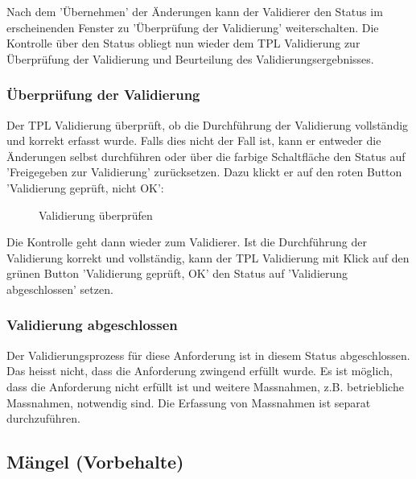 Nach dem 'Übernehmen' der Änderungen kann der Validierer den Status im erscheinenden Fenster zu 'Überprüfung der Validierung' weiterschalten. Die Kontrolle über den Status obliegt nun wieder dem TPL Validierung zur Überprüfung der Validierung und Beurteilung des Validierungsergebnisses. 

\subsubsection{Überprüfung der Validierung}
\label{bkm:Ref2018071812}

Der TPL Validierung überprüft, ob die Durchführung der Validierung vollständig und korrekt erfasst wurde. Falls dies nicht der Fall ist, kann er entweder die Änderungen selbst durchführen oder über die farbige Schaltfläche den Status auf 'Freigegeben zur Validierung' zurücksetzen. Dazu klickt er auf den roten Button 'Validierung geprüft, nicht OK': 

\begin{figure}[H]
\caption{Validierung überprüfen}
\end{figure}

Die Kontrolle geht dann wieder zum Validierer. Ist die Durchführung der Validierung korrekt und vollständig, kann der TPL Validierung mit Klick auf den grünen Button 'Validierung geprüft, OK' den Status auf 'Validierung abgeschlossen' setzen. 

\subsubsection{Validierung abgeschlossen}

Der Validierungsprozess für diese Anforderung ist in diesem Status abgeschlossen. Das heisst nicht, dass die Anforderung zwingend erfüllt wurde. Es ist möglich, dass die Anforderung nicht erfüllt ist und weitere Massnahmen, z.B. betriebliche Massnahmen, notwendig sind. Die Erfassung von Massnahmen ist separat durchzuführen.


\pagebreak

\subsection{Mängel (Vorbehalte)}

